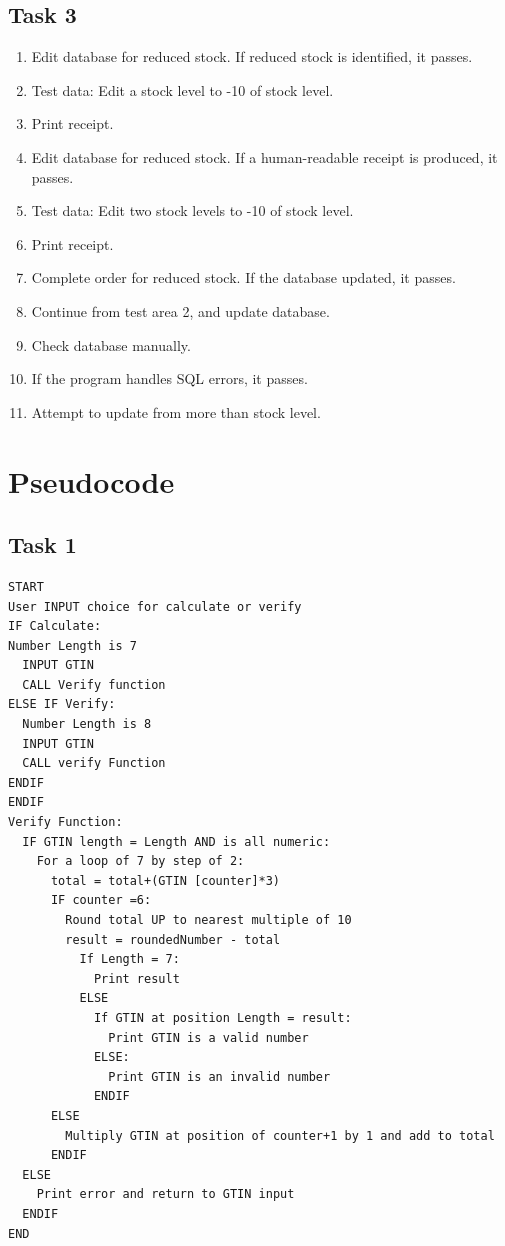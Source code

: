 \documentclass[a4paper]{article}
\begin{document}
\subsection{Task 3}
\begin{enumerate}
\item{Edit database for reduced stock. If reduced stock is identified, it passes.}
\item[~]{Test data: Edit a stock level to -10 of stock level.}
\item[~]{Print receipt.}
\item{Edit database for reduced stock. If a human-readable receipt is produced, it passes.}
\item[~]{Test data: Edit two stock levels to -10 of stock level.}
\item[~]{Print receipt.}
\item{Complete order for reduced stock. If the database updated, it passes.}
\item[~]{Continue from test area 2, and update database.}
\item[~]{Check database manually.}
\item{If the program handles SQL errors, it passes.}
\item[~]{Attempt to update from more than stock level.}
\end{enumerate}


\pagebreak

\section{Pseudocode}
\subsection{Task 1}
\begin{lstlisting}
START
User INPUT choice for calculate or verify	
IF Calculate:
Number Length is 7
  INPUT GTIN
  CALL Verify function
ELSE IF Verify:
  Number Length is 8
  INPUT GTIN
  CALL verify Function
ENDIF
ENDIF
Verify Function:
  IF GTIN length = Length AND is all numeric:
    For a loop of 7 by step of 2:
      total = total+(GTIN [counter]*3)
      IF counter =6:
        Round total UP to nearest multiple of 10
        result = roundedNumber - total
          If Length = 7:
            Print result
          ELSE
            If GTIN at position Length = result:
              Print GTIN is a valid number
            ELSE:
              Print GTIN is an invalid number
            ENDIF
      ELSE
        Multiply GTIN at position of counter+1 by 1 and add to total
      ENDIF
  ELSE
    Print error and return to GTIN input
  ENDIF
END
\end{lstlisting}
\pagebreak
\end{document}
